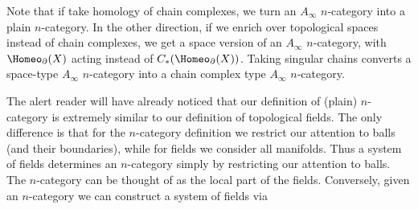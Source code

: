 Note that if take homology of chain complexes, we turn an $A_\infty$ $n$-category
into a plain $n$-category.
In the other direction, if we enrich over topological spaces instead of chain complexes,
we get a space version of an $A_\infty$ $n$-category, with $\Homeo_\bd(X)$ acting 
instead of  $C_*(\Homeo_\bd(X))$.
Taking singular chains converts a space-type $A_\infty$ $n$-category into a chain complex
type $A_\infty$ $n$-category.

\medskip

The alert reader will have already noticed that our definition of (plain) $n$-category
is extremely similar to our definition of topological fields.
The only difference is that for the $n$-category definition we restrict our attention to balls
(and their boundaries), while for fields we consider all manifolds.
Thus a system of fields determines an $n$-category simply by restricting our attention to
balls.
The $n$-category can be thought of as the local part of the fields.
Conversely, given an $n$-category we can construct a system of fields via 


\medskip


